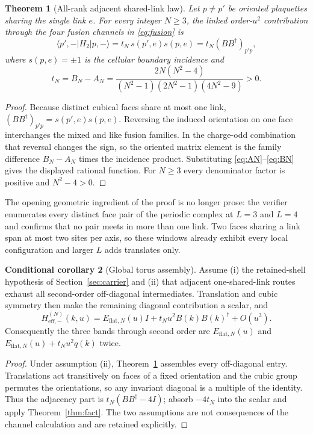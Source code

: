 \documentclass[11pt]{article}
\theoremstyle{plain}
\newtheorem{theorem}{Theorem}
\theoremstyle{definition}
\newtheorem{conditional}[theorem]{Conditional corollary}
\theoremstyle{remark}
\newcommand{\chk}[1]{}
\newcommand{\dg}{^{\dagger}}
\begin{document}
\begin{theorem}[All-rank adjacent shared-link law]\label{thm:allrank}
Let $p\ne p'$ be oriented plaquettes sharing the single link $e$. For every
integer $N\ge3$, the linked order-$u^2$ contribution through the four fusion
channels in \eqref{eq:fusion} is
\[
  \langle p',-|H_2|p,-\rangle
  =t_N\,s(p',e)s(p,e)
  =t_N(BB\dg)_{p'p},
\]
where $s(p,e)=\pm1$ is the cellular boundary incidence and
\[
  t_N=B_N-A_N=\frac{2N(N^2-4)}{(N^2-1)(2N^2-1)(4N^2-9)}>0 .
\]
\end{theorem}

\begin{proof}
Because distinct cubical faces share at most one link,
$(BB\dg)_{p'p}=s(p',e)s(p,e)$. Reversing the induced orientation on one face
interchanges the mixed and like fusion families. In the charge-odd
combination that reversal changes the sign, so the oriented matrix element is
the family difference $B_N-A_N$ times the incidence product. Substituting
\eqref{eq:AN}--\eqref{eq:BN} gives the displayed rational function. For
$N\ge3$ every denominator factor is positive and $N^2-4>0$.
\end{proof}
\chk{t\_N = B\_N - A\_N}\chk{t\_N > 0 for N >= 3}
\chk{the plaquette graph is 12-regular and two faces share at most one link}

The opening geometric ingredient of the proof is no longer prose: the
verifier enumerates every distinct face pair of the periodic complex at
$L=3$ and $L=4$ and confirms that no pair meets in more than one link. Two
faces sharing a link span at most two sites per axis, so these windows
already exhibit every local configuration and larger $L$ adds translates
only.

\begin{conditional}[Global torus assembly]\label{cor:assembly}
Assume (i) the retained-shell hypothesis of Section~\ref{sec:carrier} and
(ii) that adjacent one-shared-link routes exhaust all second-order
off-diagonal intermediates. Translation and cubic symmetry then make the
remaining diagonal contribution a scalar, and
\[
  H^{(N)}_{\mathrm{eff},-}(k,u)
  =E_{\mathrm{flat},N}(u)I+t_Nu^2B(k)B(k)\dg+O(u^3).
\]
Consequently the three bands through second order are
$E_{\mathrm{flat},N}(u)$ and
$E_{\mathrm{flat},N}(u)+t_Nu^2q(k)$ twice.
\end{conditional}

\begin{proof}
Under assumption (ii), Theorem~\ref{thm:allrank} assembles every off-diagonal
entry. Translations act transitively on faces of a fixed orientation and the
cubic group permutes the orientations, so any invariant diagonal is a multiple
of the identity. Thus the adjacency part is
$t_N(BB\dg-4I)$; absorb $-4t_N$ into the scalar and apply
Theorem~\ref{thm:fact}. The two assumptions are not consequences of the
channel calculation and are retained explicitly.
\end{proof}
\end{document}

